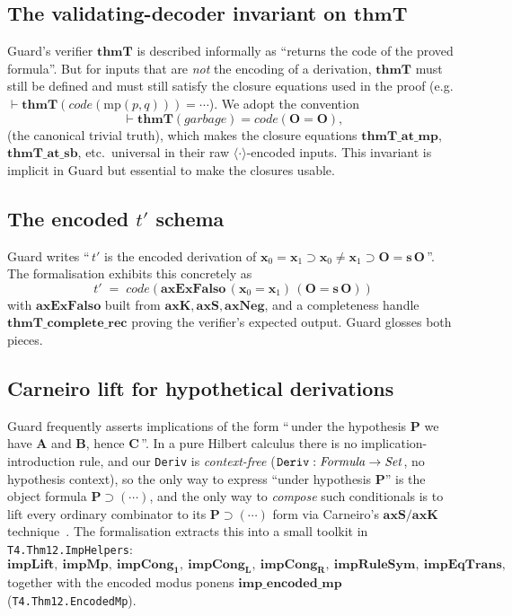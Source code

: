 \documentclass[11pt]{article}
\theoremstyle{plain}
\theoremstyle{definition}
\theoremstyle{remark}
\newcommand{\code}[1]{\mathit{code}(#1)}
\newcommand{\thmT}{\mathbf{thmT}}
\newcommand{\seq}[1]{\langle #1 \rangle}
\begin{document}
\subsection{The validating-decoder invariant on $\thmT$}

Guard's verifier $\thmT$ is described informally as ``returns the code
of the proved formula''.  But for inputs that are \emph{not} the
encoding of a derivation, $\thmT$ must still be defined and must still
satisfy the closure equations used in the proof (e.g.\
$\vdash \thmT(\code{\mathrm{mp}(p,q)}) = \cdots$).  We adopt the
convention
\[
\vdash \thmT(\mathit{garbage}) = \code{\mathbf{O} = \mathbf{O}},
\]
(the canonical trivial truth), which makes the closure equations
$\mathbf{thmT\_at\_mp}$, $\mathbf{thmT\_at\_sb}$, etc.\ universal in
their raw $\seq{\cdot}$-encoded inputs.  This invariant is implicit in Guard
but essential to make the closures usable.

\subsection{The encoded $t'$ schema}

Guard writes ``\,$t'$ is the encoded derivation of $\mathbf{x}_0 =
\mathbf{x}_1 \supset \mathbf{x}_0 \neq \mathbf{x}_1 \supset \mathbf{O}
= \mathbf{s}\,\mathbf{O}$\,''.  The formalisation exhibits this
concretely as
\[
t' \;=\; \code{\mathbf{axExFalso}\,(\mathbf{x}_0 = \mathbf{x}_1)\,(\mathbf{O} = \mathbf{s}\,\mathbf{O})}
\]
with $\mathbf{axExFalso}$ built from $\mathbf{axK}, \mathbf{axS},
\mathbf{axNeg}$, and a completeness handle
$\mathbf{thmT\_complete\_rec}$ proving the verifier's expected output.
Guard glosses both pieces.

\subsection{Carneiro lift for hypothetical derivations}
\label{sec:carneiro}

Guard frequently asserts implications of the form ``\,under the
hypothesis $\mathbf{P}$ we have $\mathbf{A}$ and $\mathbf{B}$, hence
$\mathbf{C}$\,''.  In a pure Hilbert calculus there is no
implication-introduction rule, and our \verb|Deriv| is
\emph{context-free} ($\verb|Deriv| : \mathit{Formula} \to \mathit{Set}$,
no hypothesis context), so the only way to express ``under hypothesis
$\mathbf{P}$'' is the object formula $\mathbf{P} \supset (\cdots)$, and
the only way to \emph{compose} such conditionals is to lift every
ordinary combinator to its $\mathbf{P} \supset (\cdots)$ form via
Carneiro's $\mathbf{axS}/\mathbf{axK}$ technique~\cite{Carneiro}.  The
formalisation extracts this into a small toolkit in
\verb|T4.Thm12.ImpHelpers|:
\[
\mathbf{impLift},\ \mathbf{impMp},\ \mathbf{impCong_1},\ \mathbf{impCong_L},\ \mathbf{impCong_R},\ \mathbf{impRuleSym},\ \mathbf{impEqTrans},
\]
together with the encoded modus ponens $\mathbf{imp\_encoded\_mp}$
(\verb|T4.Thm12.EncodedMp|).
\end{document}
